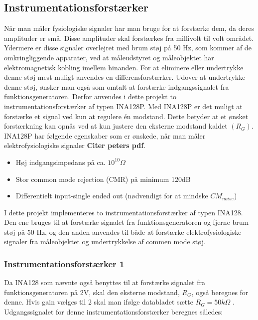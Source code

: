  \pagebreak

\subsection{Instrumentationsforstærker}
Når man måler fysiologiske signaler har man bruge for at forstærke dem, da deres amplituder er små. Disse amplituder skal forstærkes fra millivolt  til volt området. Ydermere er disse signaler overlejret med brum støj på 50 Hz, som kommer af de omkringliggende apparater, ved at måleudstyret og måleobjektet har elektromagnetisk kobling imellem hinanden. For at eliminere eller undertrykke denne støj mest muligt anvendes en differensforstærker. Udover at undertrykke denne støj, ønsker man også som omtalt at forstærke indgangssignalet fra funktionsgeneratoren. Derfor anvendes i dette projekt to instrumentationsforstærker af typen INA128P. Med INA128P er det muligt at forstærke et signal ved kun at regulere én modstand. Dette betyder at et ønsket forstærkning kan opnås ved at kun justere den eksterne modstand kaldet $(R_G)$. INA128P har følgende egenskaber som er ønskede, når man måler elektrofysiologiske signaler \textbf{Citer peters pdf}. 

\begin{itemize}
\item 	Høj indgangsimpedans på ca. $10^{10} \Omega $
\item	Stor common mode rejection (CMR) på minimum 120dB
\item 	Differentielt input-single ended out (nødvendigt for at mindske $CM_{noise}$)
\end{itemize}

I dette projekt implementeres to instrumentationsforstærker af typen INA128. Den ene bruges til at forstærke signalet fra funktionsgeneratoren og fjerne brum støj på 50 Hz, og den anden anvendes til både at forstærke elektrofysiologiske signaler fra måleobjektet og undertrykkelse af commen mode støj.


\subsubsection{Instrumentationsforstærker  1}

Da INA128 som nævnte også benyttes til at forstærke signalet fra funktionsgeneratoren på 2V, skal den eksterne modstand, $R_G$, også beregnes for denne. Hvis gain vælges til 2 skal man ifølge databladet  sætte $R_G=50k\Omega$  \citep [s.13]{TexasInstruments2005}. 
Udgangssignalet for denne instrumentationsforstærker beregnes således: 

